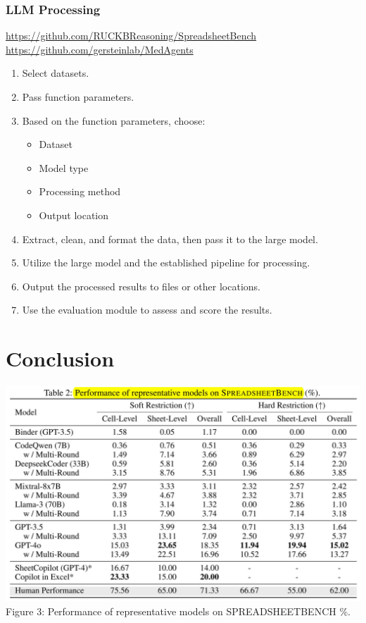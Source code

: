 \documentclass{beamer}
\begin{document}
\begin{frame}
    \frametitle{LLM Processing}
    \href{https://github.com/RUCKBReasoning/SpreadsheetBench}{https://github.com/RUCKBReasoning/SpreadsheetBench}
    \href{https://github.com/gersteinlab/MedAgents}{https://github.com/gersteinlab/MedAgents}
    \begin{enumerate}
        \item Select datasets.
        \item Pass function parameters.
        \item Based on the function parameters, choose:
        \begin{itemize}
            \item Dataset
            \item Model type
            \item Processing method
            \item Output location
        \end{itemize}
        \item Extract, clean, and format the data, then pass it to the large model.
        \item Utilize the large model and the established pipeline for processing.
        \item Output the processed results to files or other locations.
        \item Use the evaluation module to assess and score the results.
    \end{enumerate}
\end{frame}

\section{Conclusion}
\begin{frame}
    \centering
    \includegraphics[width=1\linewidth]{pic/performance.jpg}
    \vspace{0.2cm}
    {\footnotesize Figure 3: Performance of representative models on SPREADSHEETBENCH \(\%\).}
\end{frame}
\end{document}
